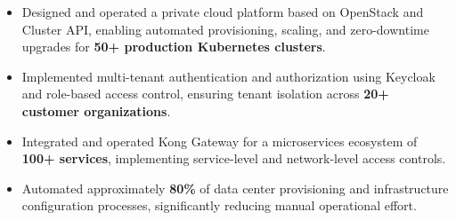 \documentclass[a4paper,10pt]{article}
\newcommand{\experience}[3]{%
    \noindent
    \textbf{#1}
    \hspace{3pt}\textbar\hspace{3pt}
    \textbf{#2}
    \hfill
    \textit{#3}
    \par
}
\newcommand{\companydesc}[1]{%
    \vspace{0.8pt}
    {\small\textit{#1}}
    \par
    \vspace{-0.6pt}
}
\newcommand{\jobspace}{%
    \vspace{2pt}
}
\begin{document}
\begin{itemize}

    \item Designed and operated a private cloud platform
    based on OpenStack and Cluster API, enabling automated
    provisioning, scaling, and zero-downtime upgrades for
    \textbf{50+ production Kubernetes clusters}.

    \item Implemented multi-tenant authentication and
    authorization using Keycloak and role-based access
    control, ensuring tenant isolation across
    \textbf{20+ customer organizations}.

    \item Integrated and operated Kong Gateway for a
    microservices ecosystem of \textbf{100+ services},
    implementing service-level and network-level
    access controls.

    \item Automated approximately \textbf{80\%} of data
    center provisioning and infrastructure configuration
    processes, significantly reducing manual operational
    effort.

\end{itemize}

\jobspace







\end{document}
